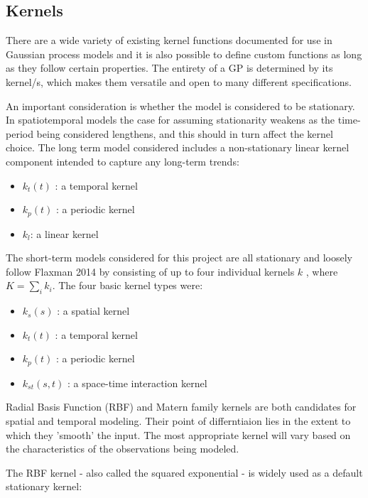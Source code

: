 \subsection{Kernels}

There are a wide variety of existing kernel functions documented for use in Gaussian process models \cite{rasmussen_2005} and it is also possible to define custom functions as long as they follow certain properties. The entirety of a GP is determined by its kernel/s, which makes them versatile and open to many different specifications. \par

An important consideration is whether the model is considered to be stationary. In spatiotemporal models the case for assuming stationarity weakens as the time-period being considered lengthens, and this should in turn affect the kernel choice. The long term model considered includes a non-stationary linear kernel component intended to capture any long-term trends:    \par

\begin{itemize}
  \item $k_t(t)$ : a temporal kernel
  \item $k_p(t)$ : a periodic kernel
  \item $k_l$: a linear kernel
\end{itemize}

The short-term models considered for this project are all stationary and loosely follow Flaxman 2014 by consisting of up to four individual kernels $k$ , where $K=\sum_{i}k_i$. The four basic kernel types were:

\begin{itemize}
  \item $k_s(s)$ : a spatial kernel
  \item $k_t(t)$ : a temporal kernel
  \item $k_p(t)$ : a periodic kernel
  \item $k_{st}(s,t)$ : a space-time interaction kernel
\end{itemize}

Radial Basis Function (RBF) and Matern family kernels are both candidates for spatial and temporal modeling. Their point of differntiaion lies in the extent to which they 'smooth' the input. The most appropriate kernel will vary based on the characteristics of the observations being modeled.

The RBF kernel - also called the squared exponential - is widely used as a default stationary kernel:

